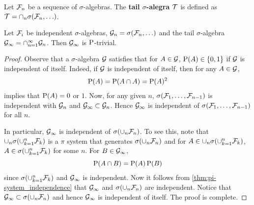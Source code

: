 \begin{definition}
    Let $\F_n$ be a sequence of $\sigma$-algebras. The \textbf{tail $\sigma$-alegra} 
    $\T$ is defined as $\T = \cap_{n}\sigma(\F_n,\ldots)$. 
\end{definition}

\begin{theorem}
    Let $\F_i$ be independent $\sigma$-algebras, $\G_n = \sigma(\F_n,\ldots)$ and the 
    tail $\sigma$-algebra $\G_{\infty} = \cap_{n=1}^\infty\G_n$. Then $\G_\infty$ is 
    $\P$-trivial. 
\end{theorem}
\begin{proof}
    Observe that a $\sigma$-algebra $\G$ satisfies that for $A\in\G$, $\P(A)\in\set{0,1}$ 
    if $\G$ is independent of itself. Indeed, if $\G$ is independent of 
    itself, then for any $A\in\G$, 
    \begin{equation*}
        \P(A) = \P(A\cap A) = \P(A)^2
    \end{equation*}
    implies that $\P(A) = 0$ or $1$. Now, for any given $n$, 
    $\sigma(\F_1,\ldots,\F_{n-1})$ is independent with $\G_n$ and $\G_\infty\subset\G_n$. 
    Hence $\G_\infty$ is independent of $\sigma(\F_1,\ldots,\F_{n-1})$ for all $n$. 
    
    In particular, $\G_\infty$ is independent of $\sigma(\cup_n\F_n)$. 
    To see this, note that $\cup_n\sigma(\cup_{k=1}^n\F_k)$ is a $\pi$ system that 
    generates $\sigma(\cup_n\F_n)$ and for $A\in\cup_n\sigma(\cup_{k=1}^n\F_k)$, 
    $A\in\sigma(\cup_{k=1}^n\F_k)$ for some $n$. For $B\in\G_\infty$, 
    \begin{equation*}
        \P(A\cap B) = \P(A)\P(B)
    \end{equation*}
    since $\sigma(\cup_{k=1}^n\F_k)$ and $\G_\infty$ is independent. Now it 
    follows from \cref{thm:pi-system_independence} that $\G_\infty$ and 
    $\sigma(\cup_n\F_n)$ are independent. Notice that $\G_\infty\subset\sigma(\cup_n\F_n)$ 
    and hence $\G_\infty$ is independent of itself. The proof is complete. 
\end{proof}


